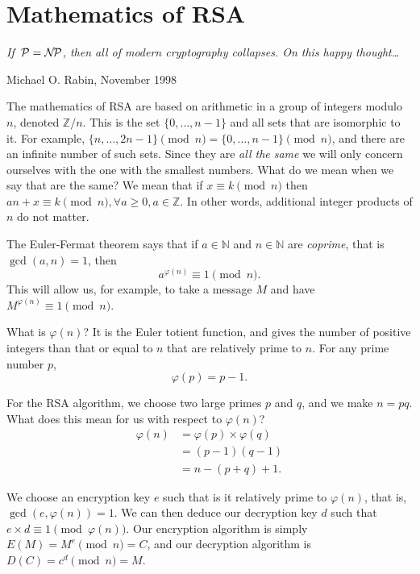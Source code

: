 \section{Mathematics of RSA}\label{proof}

\textwidth
\epigraph{\emph{If $\,{\cal P} = \mathcal{N\kern -2ptP}$, then all of modern cryptography collapses. On this happy thought\ldots}}{Michael O.\xspace Rabin, November 1998}

\noindent
The mathematics of RSA are based on arithmetic in a group of integers
modulo $n$, denoted $\mathbb{Z}/n$. This is the set $\{ 0, \ldots, n - 1
\}$ and all sets that are isomorphic to it. For example, $\{ n, \ldots,
2n -1 \} \pmod{n} = \{ 0, \ldots, n - 1 \} \pmod{n}$, and there are an
infinite number of such sets. Since they are \emph{all the same} we will
only concern ourselves with the one with the smallest numbers.  What do
we mean when we say that are the same? We mean that if $x \equiv k
\pmod{n}$ then $a n + x \equiv k \pmod{n}, \forall a \ge 0, a \in
\mathbb{Z}$. In other words, additional integer products of $n$ do not
matter.

The Euler-Fermat theorem says that if $a\in\mathbb{N}$ and
$n\in\mathbb{N}$ are \emph{coprime}, that is $\gcd(a, n) = 1$, then
$$a^{\varphi(n)} \equiv 1 \pmod{n}.$$ This will allow us, for example,
to take a message $M$ and have $M^{\varphi(n)} \equiv 1 \pmod{n}$.

What is $\varphi(n)$? It is the Euler totient function, and gives the
number of positive integers than that or equal to $n$ that are
relatively prime to $n$. For any prime number $p$,
$$
\varphi(p) = p - 1.
$$

For the RSA algorithm, we choose two large primes $p$ and $q$, and we
make $n = p q$. What does this mean for us with respect to $\varphi(n)$?
\begin{align*}
        \varphi(n) & = \varphi(p) \times \varphi(q) \\
        & = (p - 1) (q - 1) \\
        & = n - (p + q) + 1 .
\end{align*}

We choose an encryption key $e$ such that is it relatively prime to
$\varphi(n)$, that is, $\gcd(e, \varphi(n)) = 1$. We can then deduce our
decryption key $d$ such that $e \times d \equiv 1 \pmod{\varphi(n)}$.
Our encryption algorithm is simply $E(M) = M^e \pmod{n} = C$, and our
decryption algorithm is $D(C) = c^d \pmod{n} = M$.

